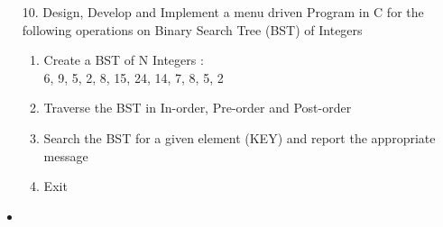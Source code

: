 \documentclass{article}
\newcommand{\answer}{\item [$\rightarrow$]}
\begin{document}
	\begin{itemize}
		\item [10. ] Design, Develop and Implement a menu driven Program in C for the following operations on Binary Search Tree (BST) of Integers

		\begin{enumerate}[label=\alph*.]
		\item Create a BST of N Integers : \\ 6, 9, 5, 2, 8, 15, 24, 14, 7, 8, 5, 2
		\item Traverse the BST in In-order, Pre-order and Post-order
		\item Search the BST for a given element (KEY) and report the appropriate message
		\item Exit
		\end{enumerate}

		\answer \inputminted{c}{../../Program10.c}
	\end{itemize}
\end{document}
